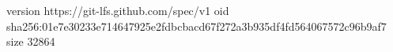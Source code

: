 version https://git-lfs.github.com/spec/v1
oid sha256:01e7e30233e714647925e2fdbcbacd67f272a3b935df4fd564067572c96b9af7
size 32864
